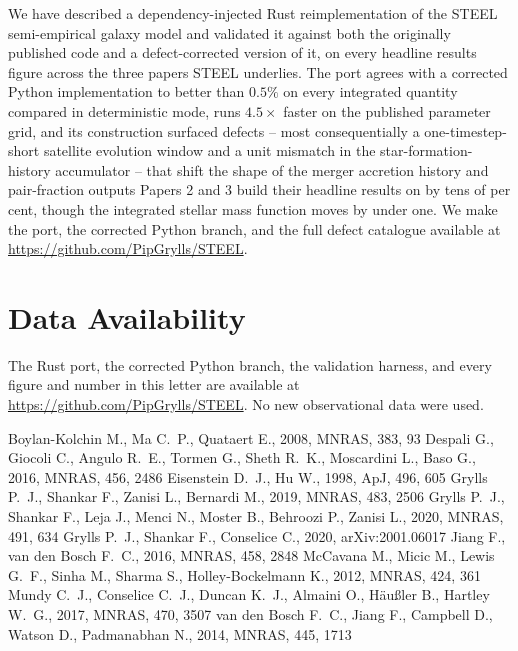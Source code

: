 \documentclass[fleqn,usenatbib]{mnras}
\begin{document}
We have described a dependency-injected Rust reimplementation of the
STEEL semi-empirical galaxy model and validated it against both the
originally published code and a defect-corrected version of it, on every
headline results figure across the three papers STEEL underlies. The
port agrees with a corrected Python implementation to better than
$0.5\%$ on every integrated quantity compared in deterministic mode, runs
$4.5\times$ faster on the published parameter grid, and its construction
surfaced defects -- most consequentially a one-timestep-short satellite
evolution window and a unit mismatch in the star-formation-history
accumulator -- that shift the shape of the merger accretion history and
pair-fraction outputs Papers 2 and 3 build their headline results on by
tens of per cent, though the integrated stellar mass function moves by
under one. We make the port, the corrected Python branch, and the full
defect catalogue available at \url{https://github.com/PipGrylls/STEEL}.

\section*{Data Availability}
The Rust port, the corrected Python branch, the validation harness, and
every figure and number in this letter are available at
\url{https://github.com/PipGrylls/STEEL}. No new observational data were
used.


\begin{thebibliography}{}
 Boylan-Kolchin M., Ma C.~P., Quataert E., 2008, MNRAS, 383, 93
 Despali G., Giocoli C., Angulo R.~E., Tormen G., Sheth R.~K., Moscardini L., Baso G., 2016, MNRAS, 456, 2486
 Eisenstein D.~J., Hu W., 1998, ApJ, 496, 605
 Grylls P.~J., Shankar F., Zanisi L., Bernardi M., 2019, MNRAS, 483, 2506
 Grylls P.~J., Shankar F., Leja J., Menci N., Moster B., Behroozi P., Zanisi L., 2020, MNRAS, 491, 634
 Grylls P.~J., Shankar F., Conselice C., 2020, arXiv:2001.06017
 Jiang F., van den Bosch F.~C., 2016, MNRAS, 458, 2848
 McCavana M., Micic M., Lewis G.~F., Sinha M., Sharma S., Holley-Bockelmann K., 2012, MNRAS, 424, 361
 Mundy C.~J., Conselice C.~J., Duncan K.~J., Almaini O., H\"{a}u{\ss}ler B., Hartley W.~G., 2017, MNRAS, 470, 3507
 van den Bosch F.~C., Jiang F., Campbell D., Watson D., Padmanabhan N., 2014, MNRAS, 445, 1713
\end{thebibliography}
\end{document}
